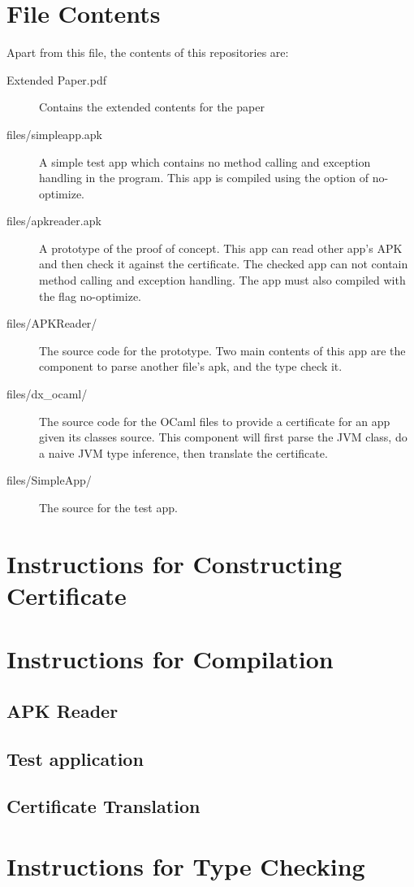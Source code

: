 \documentclass[a4]{article}
\begin{document}
\section{File Contents}
Apart from this file, the contents of this repositories are:
\begin{description}
  \item[Extended Paper.pdf] Contains the extended contents for the paper
  \item[files/simpleapp.apk] A simple test app which contains no method calling and    
    exception handling in the program. This app is compiled using the option of 
    no-optimize.
  \item[files/apkreader.apk] A prototype of the proof of concept. This app can read other
    app's APK and then check it against the certificate. The checked app can not contain
    method calling and exception handling. The app must also compiled with the flag
    no-optimize.
  \item[files/APKReader/] The source code for the prototype. Two main contents of this
    app are the component to parse another file's apk, and the type check it.
  \item[files/dx\_ocaml/] The source code for the OCaml files to provide a certificate
    for an app given its classes source. This component will first parse the JVM class,
    do a naive JVM type inference, then translate the certificate. 
  \item[files/SimpleApp/] The source for the test app.
\end{description}

\section{Instructions for Constructing Certificate}

\section{Instructions for Compilation}
\subsection{APK Reader}
\subsection{Test application}
\subsection{Certificate Translation}

\section{Instructions for Type Checking}
\end{document}
